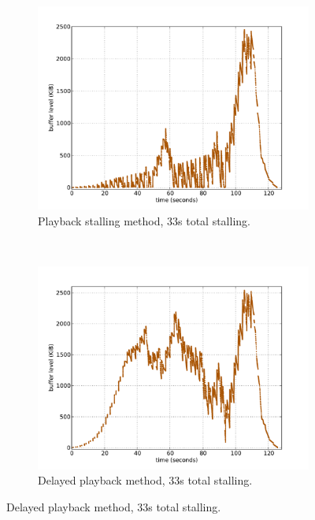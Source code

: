 \begin{figure}[t!]
        \centering
        \begin{subfigure}[b]{0.50\textwidth}
                \centering
                \includegraphics[width=\textwidth]{images/streaming/bufferlevel-stall-new.pdf}
                \caption{Playback stalling method, 33s total stalling.}
                \label{fig:bufferlevel-stall}
        \end{subfigure}%
        ~
        \begin{subfigure}[b]{0.50\textwidth}
                \centering
                \includegraphics[width=\textwidth]{images/streaming/bufferlevel-startdelay-new.pdf}
                \caption{Delayed playback method, 33s total stalling.}
                \label{fig:bufferlevel-startdelay}
        \end{subfigure}


\end{figure}

